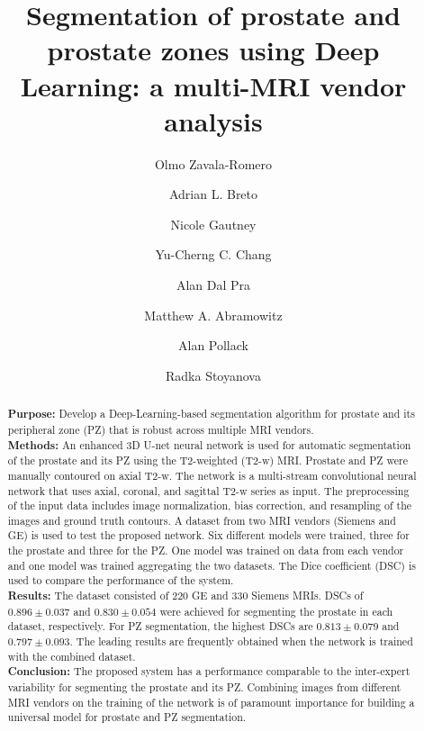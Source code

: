 \documentclass[num-refs]{wiley-article}
\title{ Segmentation of prostate and prostate zones using Deep Learning: a multi-MRI vendor analysis}
\author[1]{Olmo Zavala-Romero}
\author[1]{Adrian L. Breto }
\author[1]{Nicole Gautney}
\author[2]{Yu-Cherng C. Chang}
\author[1]{Alan Dal Pra}
\author[1]{Matthew A. Abramowitz}
\author[1]{Alan Pollack}
\author[1]{Radka Stoyanova}
\affil[1]{Department of Radiation Oncology, University of Miami Miller School of Medicine,
                Miami, FL, 33136, USA}
\affil[2]{University of Miami Miller School of Medicine,
                Miami, FL, 33136, USA}
\begin{document}
\maketitle

\begin{abstract} %
\textbf{Purpose:} Develop a Deep-Learning-based segmentation algorithm for prostate and its peripheral zone (PZ) that is robust across multiple MRI vendors. \\
\textbf{Methods:} An enhanced 3D U-net neural network is used for automatic segmentation of the prostate and its PZ using the T2-weighted (T2-w) MRI. Prostate and PZ were manually contoured on axial T2-w. The network is a multi-stream convolutional neural network that uses axial, coronal, and sagittal T2-w series as input. The preprocessing of the input data includes image normalization, bias correction, and resampling of the images and ground truth contours. A dataset from two MRI vendors (Siemens and GE) is used to test the proposed network. Six different models were trained, three for the prostate and three for the PZ. One model was trained on  data from each vendor and one model was trained aggregating the two datasets. The Dice coefficient (DSC) is used to compare the performance of the system. \\
\textbf{Results:} The dataset consisted of 220 GE and 330 Siemens MRIs. DSCs of $0.896 \pm 0.037$ and  $0.830 \pm 0.054$ were achieved for segmenting the prostate in each dataset, respectively. For PZ segmentation, the highest DSCs are $0.813 \pm 0.079$ and $0.797 \pm 0.093$. The leading results are frequently obtained when the network is trained with the combined dataset. \\
\textbf{Conclusion:} The proposed system has a performance comparable to the inter-expert variability for segmenting the prostate and its PZ. Combining images from different MRI vendors on the training of the network is of paramount importance for building a universal model for prostate and PZ segmentation. 
\end{abstract}




\end{document}
